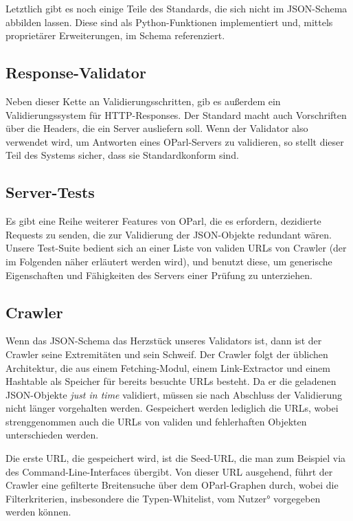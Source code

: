 \documentclass[12pt, fleqn]{scrartcl}
\begin{document}
Letztlich gibt es noch einige Teile des Standards, die sich nicht im JSON-Schema abbilden lassen. Diese sind als Python-Funktionen implementiert und, mittels proprietärer Erweiterungen, im Schema referenziert.

\subsection{Response-Validator}

Neben dieser Kette an Validierungsschritten, gib es außerdem ein Validierungssystem für HTTP-Responses. Der Standard macht auch Vorschriften über die Headers, die ein Server ausliefern soll. Wenn der Validator also verwendet wird, um Antworten eines OParl-Servers zu validieren, so stellt dieser Teil des Systems sicher, dass sie Standardkonform sind.

\subsection{Server-Tests}

Es gibt eine Reihe weiterer Features von OParl, die es erfordern, dezidierte Requests zu senden, die zur Validierung der JSON-Objekte redundant wären. Unsere Test-Suite bedient sich an einer Liste von validen URLs von Crawler (der im Folgenden näher erläutert werden wird), und benutzt diese, um generische Eigenschaften und Fähigkeiten des Servers einer Prüfung zu unterziehen.

\subsection{Crawler}


Wenn das JSON-Schema das Herzstück unseres Validators ist, dann ist der Crawler seine Extremitäten und sein Schweif. Der Crawler folgt der üblichen Architektur, die aus einem Fetching-Modul, einem Link-Extractor und einem Hashtable als Speicher für bereits besuchte URLs besteht. Da er die geladenen JSON-Objekte \emph{just in time} validiert, müssen sie nach Abschluss der Validierung nicht länger vorgehalten werden. Gespeichert werden lediglich die URLs, wobei strenggenommen auch die URLs von validen und fehlerhaften Objekten unterschieden werden.

Die erste URL, die gespeichert wird, ist die Seed-URL, die man zum Beispiel via des Command-Line-Interfaces übergibt. Von dieser URL ausgehend, führt der Crawler eine gefilterte Breitensuche über dem OParl-Graphen durch, wobei die Filterkriterien, insbesondere die Typen-Whitelist, vom Nutzer° vorgegeben werden können.
\end{document}
